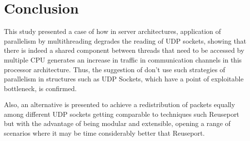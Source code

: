 \documentclass[journal]{IEEEtran}
\begin{document}
%





\section{Conclusion}
This study presented a case of how in server architectures, application of parallelism by multithreading degrades the reading of UDP sockets, showing that there is indeed a shared component between threads that need to be accessed by multiple CPU generates an increase in traffic in communication channels in this processor architecture. Thus, the suggestion of don't use such strategies of parallelism in structures such as UDP Sockets, which have a point of exploitable bottleneck, is confirmed.

Also, an alternative is presented to achieve a redistribution of packets equally among different UDP sockets getting comparable to techniques such Reuseport but with the advantage of being modular and extensible, opening a range of scenarios where it may be time considerably better that Reuseport.
\end{document}
